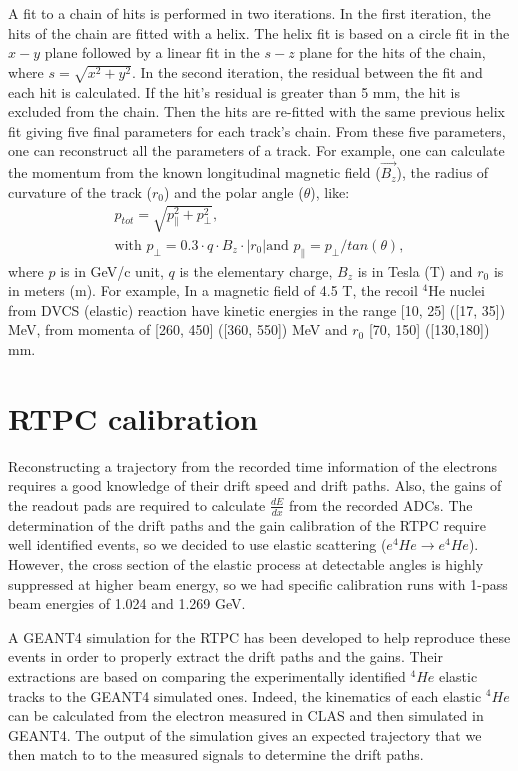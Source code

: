 A fit to a chain of hits is performed in two iterations. In the first 
iteration, the hits of the chain are fitted with a helix. The helix fit is 
based on a circle fit in the $x-y$ plane followed by a linear fit in the $s-z$ 
plane for the hits of the chain, where $s=\sqrt{x^2+y^2}$. In the second 
iteration, the residual between the fit and each hit is calculated. If the 
hit's residual is greater than 5 mm, the hit is excluded from the chain. Then 
the hits are re-fitted with the same previous helix fit giving five final 
parameters for each track's chain. From these five parameters, one can 
reconstruct all the parameters of a track. For example, one can calculate the 
momentum from the known longitudinal magnetic field ($\vec{B_{z}}$), the radius 
of curvature of the track ($r_{0}$) and the polar angle ($\theta$), like:
\begin{eqnarray}
p_{tot} = \sqrt{p_{\|}^2 + p_{\perp}^2}, ~~~~~~~~~~~~~~~~~~~~~~~~~~~~~~~~~~~~~~~ \\
\text{with } p_{\perp} = 0.3\cdot q \cdot B_{z} \cdot |r_{0}|\text{and } p_{\|} 
= p_{\perp}/tan(\theta),\nonumber
\end{eqnarray}
where $p$ is in GeV/c unit, $q$ is the elementary charge, $B_{z}$ is in Tesla 
(T) and $r_{0}$ is in meters (m). For example, In a magnetic field of 4.5 T, 
the recoil $^4$He nuclei from DVCS (elastic) reaction have kinetic energies in 
the range [10, 25] ([17, 35]) MeV, from momenta of [260, 450] ([360, 550]) MeV 
and $r_{0}$ [70, 150] ([130,180]) mm.


\section{RTPC calibration}
Reconstructing a trajectory from the recorded time information of the 
electrons requires a good knowledge of their drift speed and drift paths.  
Also, the gains of the readout pads are required to calculate $\frac{dE}{dx}$ 
from the recorded ADCs. The determination of the drift paths and the gain 
calibration of the RTPC 
require well identified events, so we decided to use elastic scattering 
($e^{4}He \rightarrow e^{4}He$). However, the cross section of 
the elastic process at detectable angles is highly suppressed at higher beam 
energy, so we had specific calibration runs with 1-pass 
beam energies of 1.024 and 1.269 GeV.

A GEANT4 simulation for the RTPC has been developed to help reproduce these 
events in order to properly extract the drift paths and the gains. Their 
extractions are based on comparing the experimentally identified $^4He$ elastic 
tracks to the GEANT4 simulated ones. Indeed, the kinematics of each elastic 
$^4He$ can be calculated from the electron measured in CLAS and then simulated 
in GEANT4. The output of the simulation gives an expected trajectory that we then
match to to the measured signals to determine the drift paths. 

